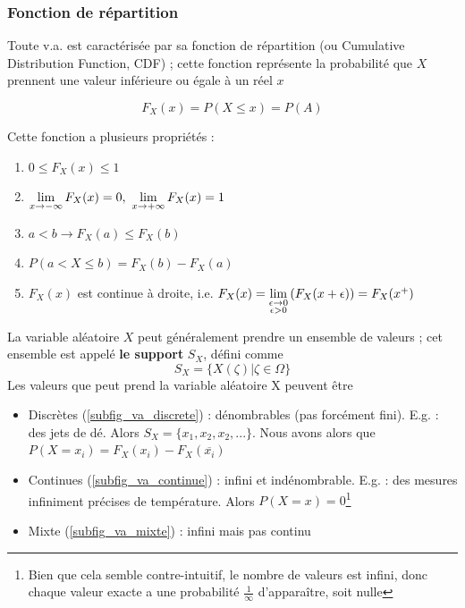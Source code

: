 \documentclass[11pt,a4paper]{article}
\numberwithin{equation}{section}
\begin{document}
\subsubsection{Fonction de répartition}
Toute v.a. est caractérisée par sa fonction de répartition (ou Cumulative Distribution Function, CDF) ; cette fonction représente la probabilité que $X$ prennent une valeur inférieure ou égale à un réel $x$ 
\begin{boite}
	\begin{equation}
		F_X(x) = P(X \leq x) = P(A)
	\end{equation}
\end{boite}
Cette fonction a plusieurs propriétés :
\begin{enumerate}[label=P\arabic*.]
	\item $0 \leq F_X(x) \leq 1$
	\item $\limite{x\to -\infty} F_X(x) = 0,\ \limite{x\to +\infty} F_X(x) = 1$
	\item $a < b \to F_X(a) \leq F_X(b)$
	\item $P(a < X \leq b) = F_X(b) - F_X(a)$
	\item $F_X(x)$ est continue à droite, i.e. $F_X(x) = \lim\limits_{\substack{\epsilon \to 0 \\ \epsilon > 0}}\left(F_X(x+\epsilon)\right) = F_X(x^+)$
\end{enumerate}
La variable aléatoire $X$ peut généralement prendre un ensemble de valeurs ; cet ensemble est appelé
 \textbf{le support} $S_X$, défini comme 
\begin{equation}
	S_X = \{X(\zeta)|\zeta \in \Omega\}
\end{equation}
Les valeurs que peut prend la variable aléatoire X peuvent être 
\begin{itemize}
	\item Discrètes (\ref{subfig_va_discrete}) : dénombrables (pas forcément fini). E.g. : des jets de dé. Alors $S_X=\{x_1,x_2,x_2,...\}$. Nous avons alors que $P(X=x_i) = F_X(x_i) - F_X(\overline{x_i})$
	\item Continues (\ref{subfig_va_continue}) : infini et indénombrable. E.g. : des mesures infiniment précises de température. Alors $P(X=x) = 0$\footnote{Bien que cela semble contre-intuitif, le nombre de valeurs est infini, donc chaque valeur exacte a une probabilité $\frac{1}{\infty}$ d'apparaître, soit nulle}
	\item Mixte (\ref{subfig_va_mixte}) : infini mais pas continu
\end{itemize}
\end{document}
